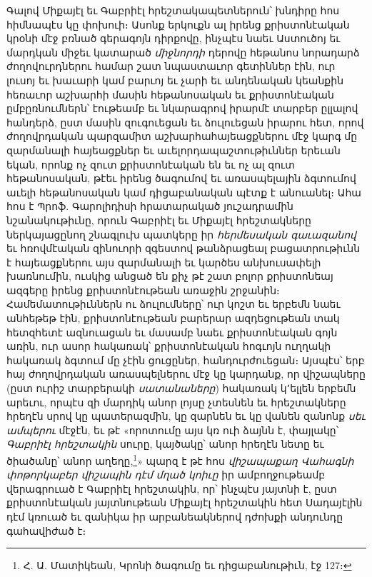 \documentclass{article}
\begin{document}
{Գալով Միքայէլ եւ Գաբրիէլ հրեշտակապետներուն՝ խնդիրը հոս հիմնապէս կը փոխուի։ Ասոնք երկուքն ալ իրենց քրիստոնէական կրօնի մէջ բռնած գերագոյն դիրքովը, ինչպէս նաեւ Աստուծոյ եւ մարդկան միջեւ կատարած \emph{միջնորդի} դերովը հեթանոս նորադարձ ժողովուրդներու համար շատ նպաստաւոր գետիններ էին, ուր լուսոյ եւ խաւարի կամ բարւոյ եւ չարի եւ անդենական կեանքին հեռաւոր աշխարհի մասին հեթանոսական եւ քրիստոնէական ըմբըռնումներն՝ էութեամբ եւ նկարագրով իրարմէ տարբեր ըլլալով հանդերձ, ըստ մասին զուգուեցան եւ ձուլուեցան իրարու հետ, որով ժողովրդական պարզամիտ աշխարհահայեացքներու մէջ կարգ մը զարմանալի հայեացքներ եւ աւելորդապաշտութիւններ երեւան եկան, որոնք ոչ զուտ քրիստոնէական են եւ ոչ ալ զուտ հեթանոսական, թէեւ իրենց ծագումով եւ առասպելային ձգտումով աւելի հեթանոսական կամ դիցաբանական պէտք է անուանել։ Ահա հոս է Պրոֆ. Գարոլիդիսի հրատարակած յուշադրամին նշանակութիւնը, որուն Գաբրիէլ եւ Միքայէլ հրեշտակները ներկայացընող շնագլուխ պատկերը իր \emph{հերմեսական գաւազանով} եւ հռովմէական զինուորի զգեստով թանձրացեալ բացատրութիւնն է հայեացքներու այս զարմանալի եւ կարծես անխուսափելի խառնումին, ուսկից անցած են քիչ թէ շատ բոլոր քրիստոնեայ ազգերը իրենց քրիստոնէութեան առաջին շրջանին։ Համեմատութիւններն ու ձուլումները՝ ուր կոշտ եւ երբեմն նաեւ անհեթեթ էին, քրիստոնէութեան բարերար ազդեցութեան տակ հետզհետէ ազնուացան եւ մասամբ նաեւ քրիստոնէական գոյն առին, ուր ասոր հակառակ՝ քրիստոնէական հոգւոյն ուղղակի հակառակ ձգտում մը չէին ցուցըներ, հանդուրժուեցան։ Այսպէս՝ երբ հայ ժողովրդական առասպելներու մէջ կը կարդանք, որ վիշապները (ըստ ուրիշ տարբերակի \emph{սատանաները}) հակառակ կ՚ելլեն երբեմն արեւու, որպէս զի մարդիկ անոր լոյսը չտեսնեն եւ հրեշտակները հրեղէն սրով կը պատերազմին, կը զարնեն եւ կը վանեն զանոնք \emph{սեւ ամպերու} մէջէն, եւ թէ «որոտումը այս կռ ուի ձայնն է, փայլակը՝ \emph{Գաբրիէլ հրեշտակին} սուրը, կայծակը՝ անոր հրեղէն նետը եւ ծիածանը՝ անոր աղեղը,\footnote{Հ. Ա. Մատիկեան, Կրոնի ծագումը եւ դիցաբանութիւն, էջ 127։}» պարզ է թէ հոս \emph{վիշապաքաղ Վահագնի փոթորկաբեր վիշապին դէմ մղած կոիւը} իր ամբողջութեամբ վերագրուած է Գաբրիէլ հրեշտակին, որ՝ ինչպէս յայտնի է, ըստ քրիստոնէական յայտնութեան Միքայէլ հրեշտակին հետ Սադայէլին դէմ կռուած եւ զանիկա իր արբանեակներով դժոխքի անդունդը գահավիժած է։

}
\end{document}
